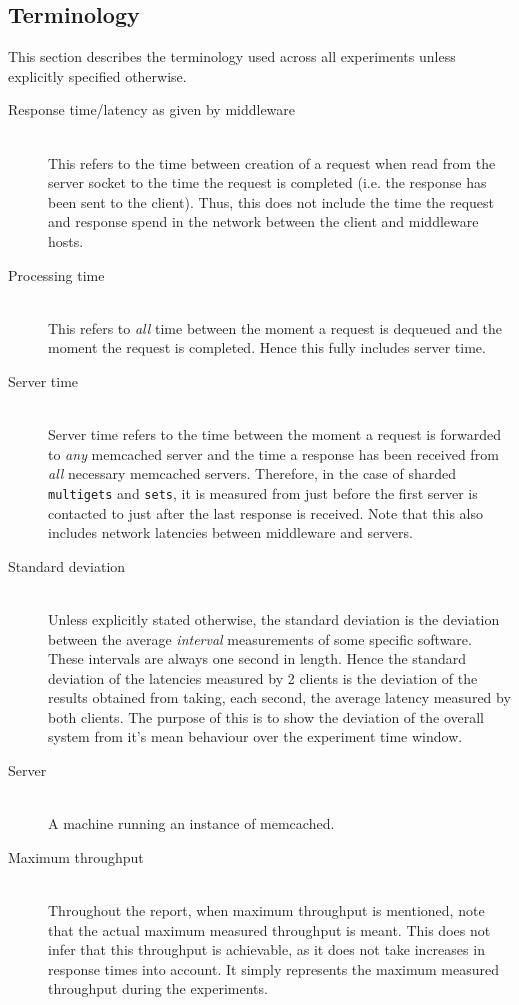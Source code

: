 \documentclass[11pt,a4paper]{article}
\begin{document}
\subsection{Terminology}
This section describes the terminology used across all experiments unless explicitly specified otherwise.
\begin{description}
    \item[Response time/latency as given by middleware]\hfill\\ This refers to the time between creation of a request when read from the server socket to the time the request is completed (i.e. the response has been sent to the client). Thus, this does not include the time the request and response spend in the network between the client and middleware hosts.
    \item[Processing time]\hfill\\ This refers to \textit{all} time between the moment a request is dequeued and the moment the request is completed. Hence this fully includes server time.
    \item[Server time]\hfill\\ Server time refers to the time between the moment a request is forwarded to \textit{any} memcached server and the time a response has been received from \textit{all} necessary memcached servers. Therefore, in the case of sharded \texttt{multigets} and \texttt{sets}, it is measured from just before the first server is contacted to just after the last response is received. Note that this also includes network latencies between middleware and servers.
    \item[Standard deviation]\hfill\\ Unless explicitly stated otherwise, the standard deviation is the deviation between the average \textit{interval} measurements of some specific software. These intervals are always one second in length. Hence the standard deviation of the latencies measured by 2 clients is the deviation of the results obtained from taking, each second, the average latency measured by both clients. The purpose of this is to show the deviation of the overall system from it's mean behaviour over the experiment time window.
    \item[Server]\hfill\\ A machine running an instance of memcached.
    \item[Maximum throughput]\hfill\\ Throughout the report, when maximum throughput is mentioned, note that the actual maximum measured throughput is meant. This does not infer that this throughput is achievable, as it does not take increases in response times into account. It simply represents the maximum measured throughput during the experiments.
\end{description}
\end{document}
